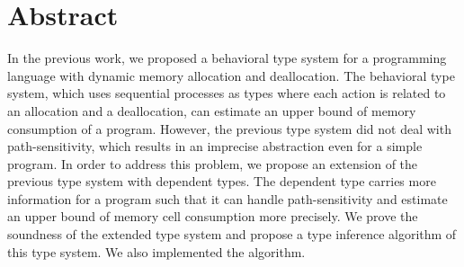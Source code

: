 \section{Abstract}
\label{sec:abstraction}
In the previous work, we proposed a behavioral type system for a
programming language with dynamic memory allocation and deallocation.
The behavioral type system, which uses sequential processes as types
where each action is related to an allocation and a deallocation, can
estimate an upper bound of memory consumption of a program.  However,
the previous type system did not deal with path-sensitivity, which
results in an imprecise abstraction even for a simple program.  In
order to address this problem, we propose an extension of the previous
type system with dependent types.  The dependent type carries more
information for a program such that it can handle path-sensitivity and
estimate an upper bound of memory cell consumption more precisely.  We
prove the soundness of the extended type system and propose a type
inference algorithm of this type system.  We also implemented the
algorithm.




